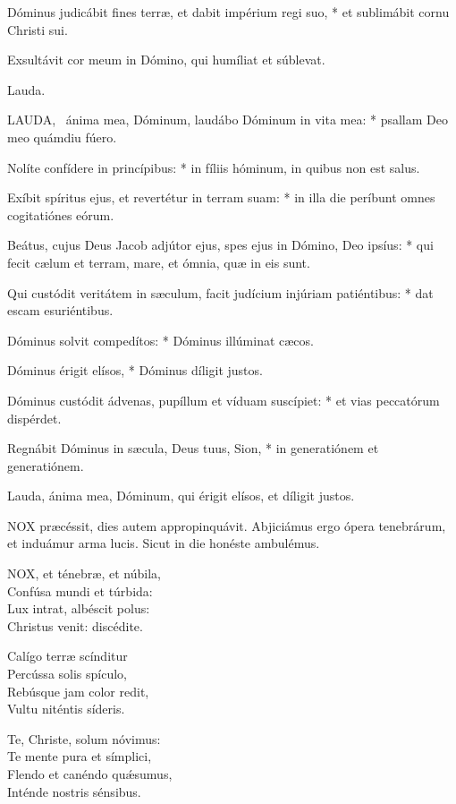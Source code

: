 Dóminus judicábit fines terræ, et dabit impérium regi suo, * et sublimábit cornu Christi sui.

 Exsultávit cor meum in Dómino, qui humíliat et súblevat.

 Lauda. \textdagger


\lettrine[lines=2]{L}{AUDA}, \textdagger\ ánima mea, Dóminum, laudábo Dóminum in vita mea: * psallam Deo meo quámdiu fúero.

Nolíte confídere in princípibus: * in fíliis hóminum, in quibus non est salus.

Exíbit spíritus ejus, et revertétur in terram suam: * in illa die períbunt omnes cogitatiónes eórum.

Beátus, cujus Deus Jacob adjútor ejus, spes ejus in Dómino, Deo ipsíus: * qui fecit cælum et terram, mare, et ómnia, quæ in eis sunt.

Qui custódit veritátem in sæculum, facit judícium injúriam patiéntibus: * dat escam esuriéntibus.

Dóminus solvit compedítos: * Dóminus illúminat cæcos.

Dóminus érigit elísos, * Dóminus díligit justos.

Dóminus custódit ádvenas, pupíllum et víduam suscípiet: * et vias peccatórum dispérdet.

Regnábit Dóminus in sæcula, Deus tuus, Sion, * in generatiónem et generatiónem.

 Lauda, ánima mea, Dóminum, qui érigit elísos, et díligit justos.


\lettrine[lines=2]{N}{OX} præcéssit, dies autem appropinquávit. Abjiciámus ergo ópera tenebrárum, et induámur arma lucis. Sicut in die honéste ambulémus.


\lettrine[lines=2]{N}{OX}, et ténebræ, et núbila,\\
Confúsa mundi et túrbida:\\
Lux intrat, albéscit polus:\\
Christus venit: discédite.

Calígo terræ scínditur\\
Percússa solis spículo,\\
Rebúsque jam color redit,\\
Vultu niténtis síderis.

Te, Christe, solum nóvimus:\\
Te mente pura et símplici,\\
Flendo et canéndo quǽsumus,\\
Inténde nostris sénsibus.


